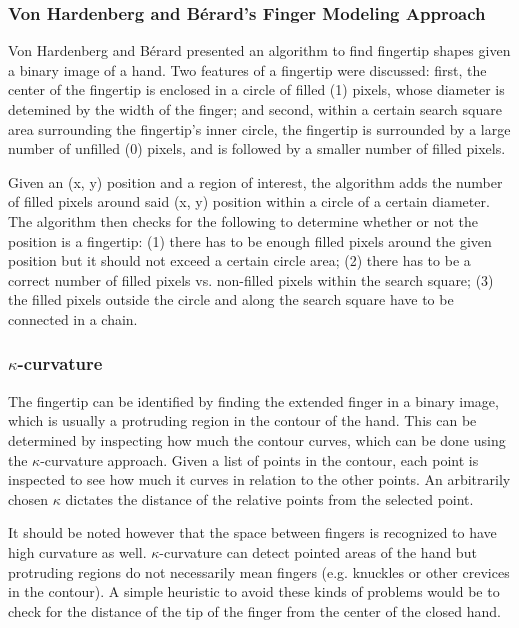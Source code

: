 \documentclass{acm_proc_article-sp}
\begin{document}
\subsubsection{Von Hardenberg and B\'erard's Finger Modeling Approach}
Von Hardenberg and B\'erard\cite{Hardenberg:2001} presented an algorithm to find fingertip shapes given a binary image of a hand. Two features of a fingertip were discussed: first, the center of the fingertip is enclosed in a circle of filled (1) pixels, whose diameter is detemined by the width of the finger; and second, within a certain search square area surrounding the fingertip's inner circle, the fingertip is surrounded by a large number of unfilled (0) pixels, and is followed by a smaller number of filled pixels.

Given an (x, y) position and a region of interest, the algorithm adds the number of filled pixels around said (x, y) position within a circle of a certain diameter. The algorithm then checks for the following to determine whether or not the position is a fingertip: (1) there has to be enough filled pixels around the given position but it should not exceed a certain circle area; (2) there has to be a correct number of filled pixels vs. non-filled pixels within the search square; (3) the filled pixels outside the circle and along the search square have to be connected in a chain.

\subsubsection{$\kappa$-curvature}
The fingertip can be identified by finding the extended finger in a binary image, which is usually a protruding region in the contour of the hand. This can be determined by inspecting how much the contour curves, which can be done using the $\kappa$-curvature approach. Given a list of points in the contour, each point is inspected to see how much it curves in relation to the other points. An arbitrarily chosen $\kappa$ dictates the distance of the relative points from the selected point.

It should be noted however that the space between fingers is recognized to have high curvature as well. $\kappa$-curvature can detect pointed areas of the hand but protruding regions do not necessarily mean fingers (e.g. knuckles or other crevices in the contour). A simple heuristic to avoid these kinds of problems would be to check for the distance of the tip of the finger from the center of the closed hand.
\end{document}
